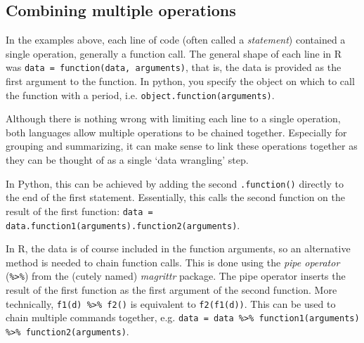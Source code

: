 \subsection{Combining multiple operations}

In the examples above, each line of code (often called a \emph{statement}) contained a single operation, generally a function call.
The general shape of each line in R was \verb+data = function(data, arguments)+, that is, the data is provided as the first argument to the function.
In python, you specify the object on which to call the function with a period,
i.e. \verb+object.function(arguments)+.

Although there is nothing wrong with limiting each line to a single operation, both languages allow multiple operations to be chained together.
Especially for grouping and summarizing, it can make sense to link these operations together as they can be thought of as a single `data wrangling' step.

In Python, this can be achieved by adding the second \verb+.function()+ directly to the end of the first statement.
Essentially, this calls the second function on the result of the first function: \verb+data = data.function1(arguments).function2(arguments)+.

In R, the data is of course included in the function arguments, so an alternative method is needed to chain function calls.
This is done using the \emph{pipe operator} (\verb+%>%+) from the (cutely named) \emph{magrittr} package.
The pipe operator inserts the result of the first function as the first argument of the second function.
More technically, \verb+f1(d) %>% f2()+ is equivalent to \verb+f2(f1(d))+.
This can be used to chain multiple commands together, e.g. \verb+data = data %>% function1(arguments) %>% function2(arguments)+.

